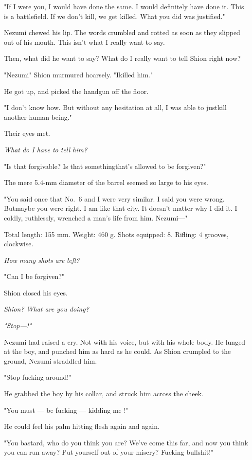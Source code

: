 "If I were you, I would have done the same. I would definitely have done
it. This is a battlefield. If we don't kill, we get killed. What you did
was justified."

Nezumi chewed his lip. The words crumbled and rotted as soon as they
slipped out of his mouth. This isn't what I really want to say.

Then, what did he want to say? What do I really want to tell Shion right
now?

"Nezumi\el " Shion murmured hoarsely. "I\el killed him."

He got up, and picked the handgun off the floor.

"I don't know how. But without any hesitation at all, I was able to
just\el kill another human being."

Their eyes met.

\emph{What do I have to tell him?}

"Is that forgivable? Is that something\el that's allowed to be
forgiven?"

The mere 5.4-mm diameter of the barrel seemed so large to his eyes.

"You said once that No.~6 and I were very similar. I said you were
wrong. But\el maybe you were right. I am like that city. It doesn't
matter why I did it. I coldly, ruthlessly, wrenched a man's life from
him. Nezumi---"

Total length: 155 mm. Weight: 460 g. Shots equipped: 8. Rifling: 4
grooves, clockwise.

\emph{How many shots are left?}

"Can I be forgiven\el ?"

Shion closed his eyes.

\emph{Shion? What are you doing?}

\emph{"Stop---!"}

Nezumi had raised a cry. Not with his voice, but with his whole body. He
lunged at the boy, and punched him as hard as he could. As Shion
crumpled to the ground, Nezumi straddled him.

"Stop fucking around!"

He grabbed the boy by his collar, and struck him across the cheek.

"You must --- be fucking --- kidding me !"

He could feel his palm hitting flesh again and again.

"You bastard, who do you think you are? We've come this far, and now you
think you can run away? Put yourself out of your misery? Fucking
bullshit!"

